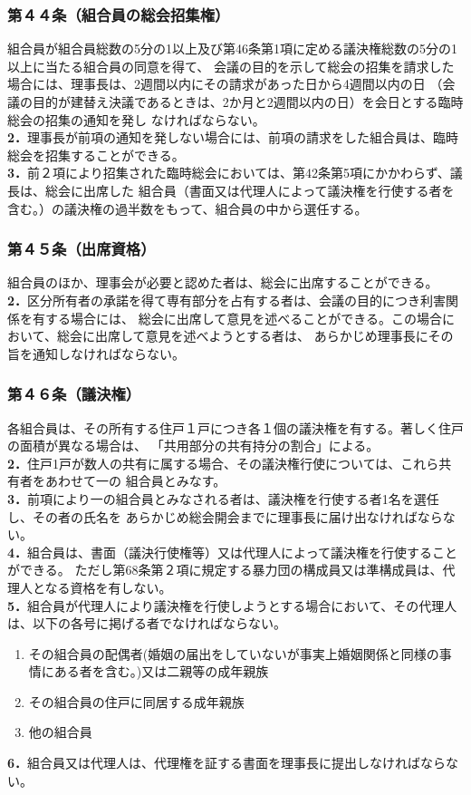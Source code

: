 \documentclass[
  luatex,
  paper=a4paper,
  fontsize=11pt,
  jafontsize=10pt,
  jlreq_notes,
]{jlreq}
\begin{document}
  \subsubsection*{第４４条（組合員の総会招集権）}
  組合員が組合員総数の5分の1以上及び第46条第1項に定める議決権総数の5分の1以上に当たる組合員の同意を得て、
  会議の目的を示して総会の招集を請求した場合には、理事長は、2週間以内にその請求があった日から4週間以内の日
  （会議の目的が建替え決議であるときは、2か月と2週間以内の日）を会日とする臨時総会の招集の通知を発し
  なければならない。\\
  \textbf{2．}理事長が前項の通知を発しない場合には、前項の請求をした組合員は、臨時総会を招集することができる。\\
  \textbf{3．}前２項により招集された臨時総会においては、第42条第5項にかかわらず、議長は、総会に出席した
  組合員（書面又は代理人によって議決権を行使する者を含む。）の議決権の過半数をもって、組合員の中から選任する。
  \subsubsection*{第４５条（出席資格）}
  組合員のほか、理事会が必要と認めた者は、総会に出席することができる。\\
  \textbf{2．}区分所有者の承諾を得て専有部分を占有する者は、会議の目的につき利害関係を有する場合には、
  総会に出席して意見を述べることができる。この場合において、総会に出席して意見を述べようとする者は、
  あらかじめ理事長にその旨を通知しなければならない。
  \subsubsection*{第４６条（議決権）}
  各組合員は、その所有する住戸１戸につき各１個の議決権を有する。著しく住戸の面積が異なる場合は、
  「共用部分の共有持分の割合」による。\\
  \textbf{2．}住戸1戸が数人の共有に属する場合、その議決権行使については、これら共有者をあわせて一の
  組合員とみなす。\\
  \textbf{3．}前項により一の組合員とみなされる者は、議決権を行使する者1名を選任し、その者の氏名を
  あらかじめ総会開会までに理事長に届け出なければならない。\\
  \textbf{4．}組合員は、書面（議決行使権等）又は代理人によって議決権を行使することができる。
  ただし第68条第２項に規定する暴力団の構成員又は準構成員は、代理人となる資格を有しない。\\
  \textbf{5．}組合員が代理人により議決権を行使しようとする場合において、その代理人は、以下の各号に掲げる者でなければならない。
  \begin{enumerate}
    \item その組合員の配偶者(婚姻の届出をしていないが事実上婚姻関係と同様の事情にある者を含む。)又は二親等の成年親族
    \item その組合員の住戸に同居する成年親族
    \item 他の組合員
  \end{enumerate}
  \textbf{6．}組合員又は代理人は、代理権を証する書面を理事長に提出しなければならない。
\end{document}
